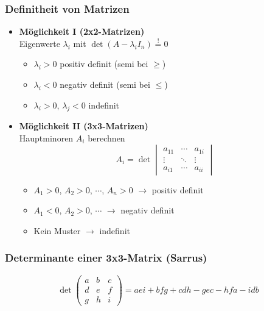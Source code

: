 \documentclass[8pt, a4paper, landscape, fleqn]{scrartcl}
\newenvironment {eq}
				{\begin{equation*}}
				{\end{equation*}}
\begin{document}
\begin{multicols*}{3}
				\subsubsection{Definitheit von Matrizen}
				\label{sec:definitheit}
				\begin{itemize}
					\item \textbf{Möglichkeit I (2x2-Matrizen)}\\
					Eigenwerte $\lambda_i$ mit $\det(A-\lambda_i I_n) \overset{!}{=}0$
					\begin{itemize}
						\item $\lambda_i>0 $ positiv definit (semi bei $\ge$)
						\item $\lambda_i<0 $ negativ definit (semi bei $\le$)
						\item $\lambda_i>0$, $\lambda_j<0$ indefinit
					\end{itemize}
					\item \textbf{Möglichkeit II (3x3-Matrizen)}\\
					Hauptminoren $A_i$ berechnen
					\begin{equation*}
					A_i=\det
					\begin{vmatrix}
					a_{11} &\cdots &a_{1i}\\
					\vdots &\ddots &\vdots\\
					a_{i1} &\cdots &a_{ii}
					\end{vmatrix}
					\end{equation*}
					\begin{itemize}
						\item $A_1>0$, $A_2>0$, $\cdots$, $A_n>0$ $\rightarrow$ positiv definit
						\item $A_1<0$, $A_2>0$, $\cdots$ $\rightarrow$ negativ definit
						\item Kein Muster $\rightarrow$ indefinit
					\end{itemize}
				\end{itemize}
				\subsubsection{Determinante einer 3x3-Matrix (Sarrus)}
				\begin{eq}
				        \det \begin{pmatrix}
				            a & b & c \\ d & e & f \\ g & h & i
				        \end{pmatrix} = aei + bfg + cdh -gec -hfa-idb
				\end{eq}

\end{multicols*}
\end{document}
